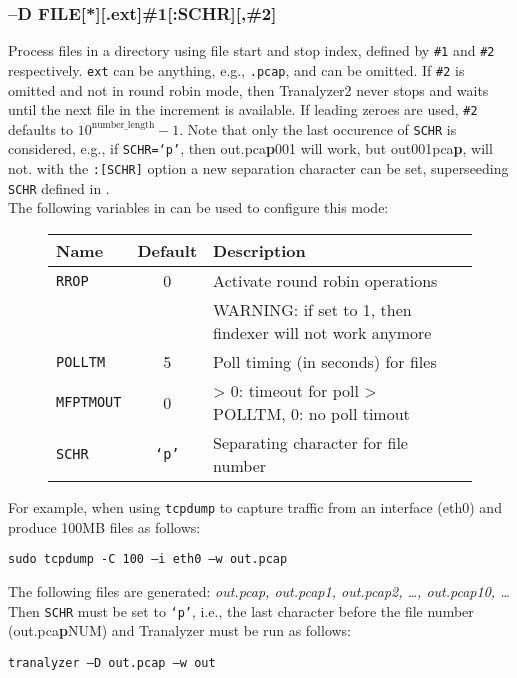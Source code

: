 \subsubsection{--D FILE[*][.ext]\#1[:SCHR][,\#2]}
Process files in a directory using file start and stop index, defined by {\tt \#1} and {\tt \#2} respectively. {\tt ext} can be anything, e.g., {\tt .pcap}, and can be omitted. If {\tt \#2} is omitted and not in round robin mode, then Tranalyzer2 never stops and waits until the next file in the increment is available. If leading zeroes are used, {\tt \#2} defaults to $10^\text{number\_length}-1$. Note that only the last occurence of {\tt SCHR} is considered, e.g., if {\tt SCHR=`p'}, then out.pca{\bf p}001 will work, but out001pca{\bf p}, will not. with the {\tt :[SCHR]} option a new separation character can be set, superseeding {\tt SCHR} defined in .\\

The following variables in  can be used to configure this mode:

\begin{figure}[!ht]
\begin{longtable}{lcll}
    \toprule
    {\bf Name} & {\bf Default} & {\bf Description}\\
    \midrule\endhead%
    {\tt RROP}     & 0 & Activate round robin operations\\
                   &   & WARNING: if set to 1, then findexer will not work anymore\\
    {\tt POLLTM}   & 5 & Poll timing (in seconds) for files \\
    {\tt MFPTMOUT} & 0 & > 0: timeout for poll > POLLTM, 0: no poll timout \\
    {\tt SCHR} & {\tt `p'} & Separating character for file number\\
    \bottomrule
\end{longtable}
\end{figure}

For example, when using {\tt tcpdump} to capture traffic from an interface (eth0) and produce 100MB files as follows:
\begin{center}
    {\tt sudo tcpdump -C 100 --i eth0 --w out.pcap}
\end{center}
The following files are generated: {\em out.pcap, out.pcap1, out.pcap2, \ldots, out.pcap10, \ldots}\\

Then {\tt SCHR} must be set to {\tt `p'}, i.e., the last character before the file number (out.pca{\bf p}NUM) and Tranalyzer must be run as follows:
\begin{center}
    {\tt tranalyzer --D out.pcap --w out}
\end{center}

